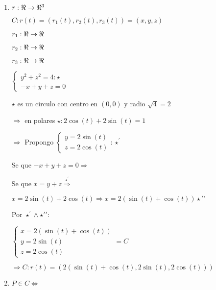 \documentclass[../parcial.tex]{subfiles}
\begin{document}
    \begin{enumerate}
        \item 

            $r: \real \to \real^3 $

            $C: r(t) = (r_1(t), r_2(t), r_3(t)) = (x,y,z)$

            $r_1: \real \to \real $

            $r_2: \real \to \real $

            $r_3: \real \to \real $

            $\left\{
                \begin{array}{ll}
                    y^2 + z^2 = 4 : \star\\
                    -x + y + z = 0
                \end{array}
            \right.$

            $\star$ es un circulo con centro en $(0,0)$ y radio $\sqrt{4}=2$

            $ \Rightarrow $ en polares $\star: 2\cos(t) + 2\sin(t) = 1$

            $ \Rightarrow $ Propongo $\left\{
                \begin{array}{ll}
                    y = 2\sin(t) \\
                    z = 2\cos(t)
                \end{array}
            \right. : \star^\prime$

            Se que $ -x + y + z = 0 \Rightarrow$

            Se que $ x = y + z \stackrel{\star^\prime}{\Rightarrow}$

            $ x = 2\sin(t) + 2\cos(t) \Rightarrow x = 2(\sin(t)+ \cos(t)) \star{\prime\prime}$

            Por $ \star^\prime \wedge \star{\prime\prime} : $

            $\left\{
                \begin{array}{ll}
                    x = 2(\sin(t) + \cos(t)) \\
                    y = 2\sin(t) \\
                    z = 2\cos(t)
                \end{array}
            \right. = C$
            
            $\Rightarrow C: r(t)=(2(\sin(t)+\cos(t), 2\sin(t), 2\cos(t)))$

        \item $P \in C \Leftrightarrow$


\end{enumerate}
\end{document}
